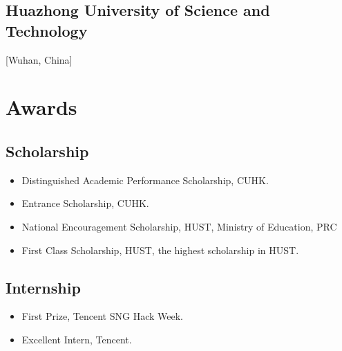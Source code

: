 \documentclass{mycv}
\begin{document}
\subsection{Huazhong University of Science and Technology}[Wuhan, China]
\begin{positions}
\end{positions}
\vspace{-\parskip}%



\section{Awards}
\subsection{Scholarship}
\vspace{-\parskip}%
\begin{itemize}
  \item Distinguished Academic Performance Scholarship, CUHK. 
  \item Entrance Scholarship, CUHK. 
  \item National Encouragement Scholarship, HUST, Ministry of Education, PRC 
  \item First Class Scholarship, HUST, the highest scholarship in HUST. 
\end{itemize}
\vspace{-\parskip}%
\subsection{Internship}
\vspace{-\parskip}%
\begin{itemize}
  \item First Prize, Tencent SNG Hack Week. 
  \item Excellent Intern, Tencent. 
\end{itemize}


\end{document}
